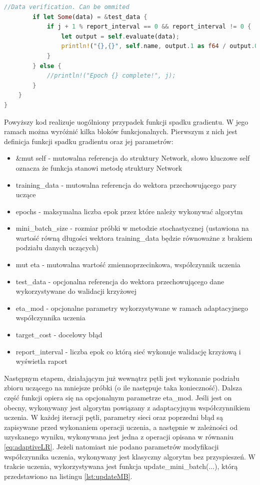 \documentclass[12pt,twoside]{article}
\begin{document}
\begin{lstlisting}[language=Rust,caption=Realizacja funkcji stochastycznego spadku gradientu,label={lst:sgd}]
		//Data verification. Can be ommited
		if let Some(data) = &test_data {
			if j + 1 % report_interval == 0 && report_interval != 0 {
				let output = self.evaluate(data);
				println!("{},{}", self.name, output.1 as f64 / output.0 as f64);
			}
		} else {
			//println!("Epoch {} complete!", j);
		}
	}
}
\end{lstlisting}

Powyższy kod realizuje uogólniony przypadek funkcji spadku gradientu.
W jego ramach można wyróżnić kilka bloków funkcjonalnych.
Pierwszym z nich jest definicja funkcji spadku gradientu oraz jej parametrów:
\begin{itemize}
	\item &mut self - mutowalna referencja do struktury Network, słowo kluczowe self oznacza że funkcja stanowi metodę struktury Network
	\item training\_data - mutowalna referencja do wektora przechowującego pary uczące
	\item epochs - maksymalna liczba epok przez które należy wykonywać algorytm
	\item mini\_batch\_size - rozmiar próbki w metodzie stochastycznej (ustawiona na wartość równą długości wektora training\_data będzie równoważne z brakiem podziału danych uczących)
	\item mut eta - mutowalna wartość zmiennoprzecinkowa, współczynnik uczenia
	\item test\_data - opcjonalna referencja do wektora przechowującego dane wykorzystywane do walidacji krzyżowej
	\item eta\_mod - opcjonalne parametry wykorzystywane w ramach adaptacyjnego współczynnika uczenia
	\item target\_cost - docelowy błąd
	\item report\_interval - liczba epok co którą sieć wykonuje walidację krzyżową i wyświetla raport
\end{itemize}

Następnym etapem, działającym już wewnątrz pętli jest wykonanie  podziału zbioru uczącego na mniejsze próbki (o ile następuje taka konieczność).
Dalsza część funkcji opiera się na opcjonalnym parametrze eta\_mod.
Jeśli jest on obecny, wykonywany jest algorytm powiązany z adaptacyjnym współczynnikiem uczenia.
W każdej iteracji pętli, parametry sieci oraz poprzedni błąd są zapisywane przed wykonaniem operacji uczenia, a następnie w zależności od uzyskanego wyniku, wykonywana jest jedna z operacji opisana w równaniu \ref{eq:adaptiveLR}.
Jeżeli natomiast nie podano parametrów modyfikacji współczynnika uczenia, wykonywany jest klasyczny algorytm bez przyspieszeń.
W trakcie uczenia, wykorzystywana jest funkcja update\_mini\_batch(...), którą przedstawiono na listingu \ref{lst:updateMB}.
\end{document}
